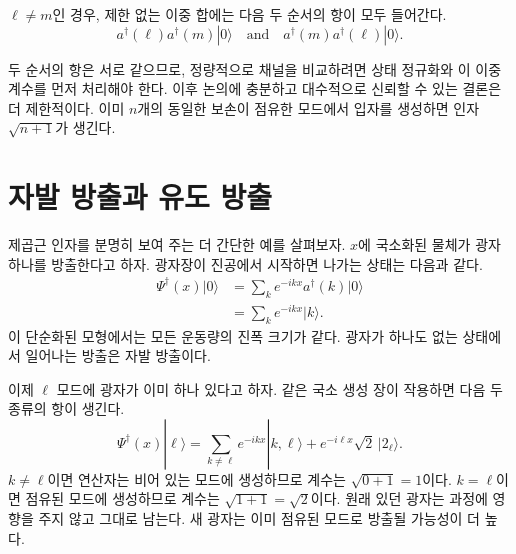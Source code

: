 \(\ell\ne m\)인 경우, 제한 없는 이중 합에는 다음 두 순서의 항이 모두 들어간다.
\begin{equation}
a^\dagger(\ell)a^\dagger(m)|0\rangle
\quad\text{and}\quad
a^\dagger(m)a^\dagger(\ell)|0\rangle.
\end{equation}

\begin{classroomqa}\end{classroomqa}

두 순서의 항은 서로 같으므로, 정량적으로 채널을 비교하려면 상태 정규화와 이 이중 계수를 먼저 처리해야 한다. 이후 논의에 충분하고 대수적으로 신뢰할 수 있는 결론은 더 제한적이다. 이미 \(n\)개의 동일한 보손이 점유한 모드에서 입자를 생성하면 인자 \(\sqrt{n+1}\)가 생긴다.

\section{자발 방출과 유도 방출}

제곱근 인자를 분명히 보여 주는 더 간단한 예를 살펴보자. \(x\)에 국소화된 물체가 광자 하나를 방출한다고 하자. 광자장이 진공에서 시작하면 나가는 상태는 다음과 같다.
\begin{align}
\Psi^\dagger(x)|0\rangle
&=\sum_k e^{-ikx}a^\dagger(k)|0\rangle\\
&=\sum_k e^{-ikx}|k\rangle.
\end{align}
이 단순화된 모형에서는 모든 운동량의 진폭 크기가 같다. 광자가 하나도 없는 상태에서 일어나는 방출은 자발 방출이다.

이제 \(\ell\) 모드에 광자가 이미 하나 있다고 하자. 같은 국소 생성 장이 작용하면 다음 두 종류의 항이 생긴다.
\begin{equation}
\Psi^\dagger(x)|\ell\rangle
=
\sum_{k\ne\ell}e^{-ikx}|k,\ell\rangle
+e^{-i\ell x}\sqrt{2}\,|2_\ell\rangle.
\end{equation}
\(k\ne\ell\)이면 연산자는 비어 있는 모드에 생성하므로 계수는 \(\sqrt{0+1}=1\)이다. \(k=\ell\)이면 점유된 모드에 생성하므로 계수는 \(\sqrt{1+1}=\sqrt{2}\)이다. 원래 있던 광자는 과정에 영향을 주지 않고 그대로 남는다. 새 광자는 이미 점유된 모드로 방출될 가능성이 더 높다.

\begin{classroomqa}\end{classroomqa}

